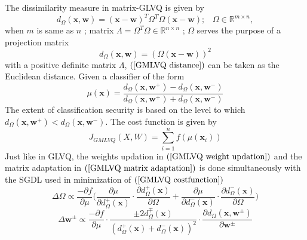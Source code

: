 \documentclass[english]{HSMW-Thesis}
\begin{document}
The dissimilarity measure in matrix-GLVQ is given by
\begin{equation*}%
	d_\Omega\left( \mathbf{x},\mathbf{w}\right)=\left( \mathbf{x}-\mathbf{w}\right) ^{T}\Omega^{T}\Omega\left( \mathbf{x}-\mathbf{w}\right) ;\hspace{10pt} \Omega \in \mathbb{R}^{m\times n},
\end{equation*}
when\hspace{2pt} $m$\hspace{2pt} is same as\hspace{2pt} $n$ ; matrix $\Lambda=\Omega^T \Omega \in \mathbb{R}^{n\times n}$  ; $\Omega$ \hspace{2pt}serves the purpose of a projection matrix\cite{villmann2017can}
\begin{equation}\label{GMLVQ distance}
	d_\Omega \left( \mathbf{x},\mathbf{w}\right) =\left( \Omega\left( \mathbf{x}- \mathbf{w}\right)\right) ^2
\end{equation}
with a positive definite matrix\hspace{2pt} $\Lambda$, $ \left( \ref{GMLVQ distance} \right)$ can be taken as the Euclidean distance.
Given a classifier of the form
\begin{equation*}%
	\mu\left( \mathbf{x}\right) =\frac{d_\Omega\left( \mathbf{x},\mathbf{w}^{+}\right)-d_\Omega\left( \mathbf{x},\mathbf{w}^{-}\right)  }{d_\Omega\left( \mathbf{x},\mathbf{w}^{+}\right)+d_\Omega\left( \mathbf{x},\mathbf{w}^{-} \right) }
\end{equation*}
The extent of classification security is based on the level to which\hspace{2pt} $d_\Omega\left( \mathbf{x},\mathbf{w}^{+}\right)<d_\Omega\left( \mathbf{x},\mathbf{w}^{-}\right)$\cite{article}.
The cost function is given by
\begin{equation}\label{GMLVQ costfunction}
	J_{GMLVQ}\left( X,W\right) =\sum_{i=1}^{n}f\left( \mu\left( \mathbf{x}_i\right) \right) 
\end{equation}
Just like in GLVQ, the weights updation in $\left(  \ref{GMLVQ weight updation}\right)$ and the matrix adaptation in $\left( \ref{GMLVQ matrix adaptation}\right)$  is done simultaneously\cite{schneider2009adaptive} with the SGDL used in minimization of $\left( \ref{GMLVQ costfunction}\right)$
\begin{equation}\label{GMLVQ matrix adaptation}
	\Delta \Omega\propto \frac{-\partial f}{\partial \mu}\Bigg(  \frac{\partial \mu}{\partial d_{\Omega}^{+}\left( \mathbf{x}\right)}\cdot\frac{\partial d_{\Omega}^{+}\left( \mathbf{x}\right) }{\partial \Omega}+\frac{\partial \mu}{\partial d_{\Omega}^{-}\left( \mathbf{x}\right)}\cdot\frac{\partial d_{\Omega}^{-}\left( \mathbf{x}\right) }{\partial \Omega} \Bigg)
\end{equation}
\begin{equation}\label{GMLVQ weight updation}
	\Delta \mathbf{w}^{\pm}\propto \frac{-\partial f}{\partial \mu}\cdot\frac{\pm 2d_{\Omega}^{\mp}\left( \mathbf{x}\right) }{\left( d_{\Omega}^{+}\left( \mathbf{x}\right) +d_{\Omega}^{-}\left( \mathbf{x}\right) \right)^2 }\cdot\frac{\partial d_{\Omega}\left( \mathbf{x},\mathbf{w}^{\pm }\right) }{\partial \mathbf{w}^{\pm}}
\end{equation}
\end{document}
